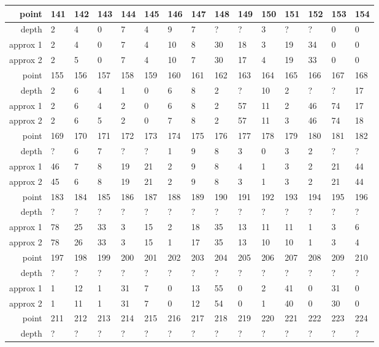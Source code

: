 \begin{center}
\begin{supertabular}{|r|l l l l l l l l l l l l l l|}
\hline
point & 141 & 142 & 143 & 144 & 145 & 146 & 147 & 148 & 149 & 150 & 151 & 152 & 153 & 154 \\
\hline
depth & 2 & 4 & 0 & 7 & 4 & 9 & 7 & ? & ? & 3 & ? & ? & 0 & 0 \\
approx 1 & 2 & 4 & 0 & 7 & 4 & 10 & 8 & 30 & 18 & 3 & 19 & 34 & 0 & 0 \\
approx 2 & 2 & 5 & 0 & 7 & 4 & 10 & 7 & 30 & 17 & 4 & 19 & 33 & 0 & 0 \\
\hline
point & 155 & 156 & 157 & 158 & 159 & 160 & 161 & 162 & 163 & 164 & 165 & 166 & 167 & 168 \\
\hline
depth & 2 & 6 & 4 & 1 & 0 & 6 & 8 & 2 & ? & 10 & 2 & ? & ? & 17 \\
approx 1 & 2 & 6 & 4 & 2 & 0 & 6 & 8 & 2 & 57 & 11 & 2 & 46 & 74 & 17 \\
approx 2 & 2 & 6 & 5 & 2 & 0 & 7 & 8 & 2 & 57 & 11 & 3 & 46 & 74 & 18 \\
\hline
point & 169 & 170 & 171 & 172 & 173 & 174 & 175 & 176 & 177 & 178 & 179 & 180 & 181 & 182 \\
\hline
depth & ? & 6 & 7 & ? & ? & 1 & 9 & 8 & 3 & 0 & 3 & 2 & ? & ? \\
approx 1 & 46 & 7 & 8 & 19 & 21 & 2 & 9 & 8 & 4 & 1 & 3 & 2 & 21 & 44 \\
approx 2 & 45 & 6 & 8 & 19 & 21 & 2 & 9 & 8 & 3 & 1 & 3 & 2 & 21 & 44 \\
\hline
point & 183 & 184 & 185 & 186 & 187 & 188 & 189 & 190 & 191 & 192 & 193 & 194 & 195 & 196 \\
\hline
depth & ? & ? & ? & ? & ? & ? & ? & ? & ? & ? & ? & ? & ? & ? \\
approx 1 & 78 & 25 & 33 & 3 & 15 & 2 & 18 & 35 & 13 & 11 & 11 & 1 & 3 & 6 \\
approx 2 & 78 & 26 & 33 & 3 & 15 & 1 & 17 & 35 & 13 & 10 & 10 & 1 & 3 & 4 \\
\hline
point & 197 & 198 & 199 & 200 & 201 & 202 & 203 & 204 & 205 & 206 & 207 & 208 & 209 & 210 \\
\hline
depth & ? & ? & ? & ? & ? & ? & ? & ? & ? & ? & ? & ? & ? & ? \\
approx 1 & 1 & 12 & 1 & 31 & 7 & 0 & 13 & 55 & 0 & 2 & 41 & 0 & 31 & 0 \\
approx 2 & 1 & 11 & 1 & 31 & 7 & 0 & 12 & 54 & 0 & 1 & 40 & 0 & 30 & 0 \\
\hline
point & 211 & 212 & 213 & 214 & 215 & 216 & 217 & 218 & 219 & 220 & 221 & 222 & 223 & 224 \\
\hline
depth & ? & ? & ? & ? & ? & ? & ? & ? & ? & ? & ? & ? & ? & ? \\

\end{supertabular}
\end{center}
